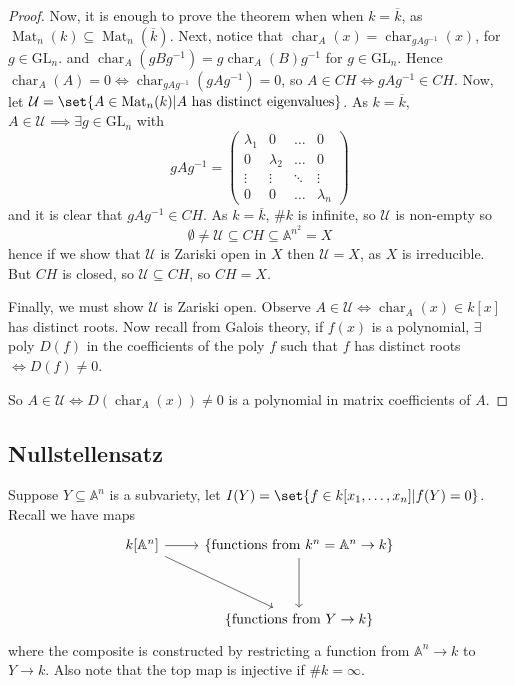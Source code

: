 \documentclass{article}
\newcommand{\A}{\mathbb{A}}
\DeclareMathOperator{\Mat}{Mat}
\DeclareMathOperator{\chara}{char}
\begin{document}
\begin{proof}
    Now, it is enough to prove the theorem when when $k = \overline{k}$, as $\Mat_n(k) \subseteq \Mat_n(\overline{k})$.
    Next, notice that $\chara_A(x) = \chara_{g A g^{-1}} (x)$, for $g \in \text{GL}_n$. and $\chara_A(g B g^{-1}) = g \chara_A(B) g^{-1}$ for $g \in \text{GL}_n$.
    Hence $\chara_A(A) = 0 \iff \chara_{g A g^{-1}}(g A g^{-1}) = 0$, so
    $A \in CH \iff g A g^{-1} \in CH$.
    Now, let $\mathcal{U} = \set{A \in \Mat_n(k) | A \text{ has distinct eigenvalues}}$. As $k = \overline{k}$, $A \in \mathcal{U} \implies \exists g \in \text{GL}_n$ with
    \begin{equation*}
        g A g^{-1} = \begin{pmatrix}
            \lambda_1 & 0 & \dots & 0 \\
            0 & \lambda_2 & \dots & 0 \\
            \vdots & \vdots & \ddots & \vdots \\
            0 & 0 & \dots & \lambda_n
        \end{pmatrix}
    \end{equation*}
    and it is clear that $g A g^{-1} \in CH$.
    As $k = \overline{k}$, $\#k$ is infinite, so $\mathcal{U}$ is non-empty so
    \begin{equation*}
        \emptyset \neq \mathcal{U} \subseteq CH \subseteq \A^{n^2} = X
    \end{equation*}
    hence if we show that $\mathcal{U}$ is Zariski open in $X$ then $\mathcal{U} = X$, as $X$ is irreducible. But $CH$ is closed, so $\mathcal{U} \subseteq CH$, so $CH=X$.

    Finally, we must show $\mathcal{U}$ is Zariski open.
    Observe $A \in \mathcal{U} \iff \chara_A(x) \in k[x]$ has distinct roots.
    Now recall from Galois theory, if $f(x)$ is a polynomial, $\exists$ poly $D(f)$ in the coefficients of the poly $f$ such that $f$ has distinct roots $\iff D(f) \neq 0$.

    So $A \in \mathcal{U} \iff D(\chara_A(x)) \neq 0$ is a polynomial in matrix coefficients of $A$.
\end{proof}

\subsection{Nullstellensatz}
Suppose $Y \subseteq \A^n$ is a subvariety,
let $I(Y) = \set{f \in k[x_1, \dotsc, x_n] | f(Y) = 0}$.
Recall we have maps
\begin{equation*}
    \begin{tikzcd}
        k[\A^n] \arrow[r] \arrow[rdd] & \{\text{functions from } k^n = \A^n \to k\} \arrow[dd] \\
                                     &\\
                         & \{\text{functions from } Y \to k\}
    \end{tikzcd}
\end{equation*}
where the composite is constructed by restricting a function from $\A^n \to k$ to $Y \to k$. Also note that the top map is injective if $\#k = \infty$.
\end{document}
